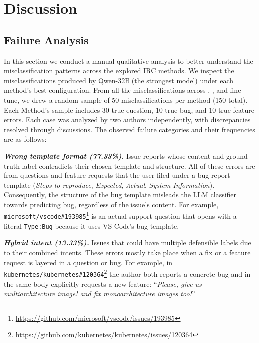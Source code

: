 
\section{Discussion}
\label{sec:discussion}

\subsection{Failure Analysis}
\label{sec:disc-failures}

In this section we conduct a manual qualitative analysis to better understand the misclassification patterns across the explored IRC methods. We inspect the misclassifications produced by Qwen-32B (the strongest model) under each method's best configuration. From all the misclassifications across \ragtag, \bragtag, and fine-tune, we drew a random sample of 50 misclassifications per method (150 total). Each Method's sample includes 30 true-question, 10 true-bug, and 10 true-feature errors. Each case was analyzed by two authors independently, with discrepancies resolved through discussions. The observed failure categories and their frequencies are as follows:

\textbf{\textit{Wrong template format (77.33\%).}} Issue reports whose content and ground-truth label contradicts their chosen template and structure. All of these errors are from questions and feature requests that the user filed under a bug-report template (\textit{Steps to reproduce}, \textit{Expected}, \textit{Actual}, \textit{System Information}). Consequently, the structure of the bug template misleads the LLM classifier towards predicting bug, regardless of the issue's content. For example, \texttt{microsoft/vscode\#193985}\footnote{\url{https://github.com/microsoft/vscode/issues/193985}} is an actual support question that opens with a literal \texttt{Type:Bug} because it uses VS Code's bug template.

\textbf{\textit{Hybrid intent (13.33\%).}} Issues that could have multiple defensible labels due to their combined intents. These errors mostly take place when a fix or a feature request is layered in a question or bug. For example, in \texttt{kubernetes/kubernetes\#120364}\footnote{\url{https://github.com/kubernetes/kubernetes/issues/120364}} the author both reports a concrete bug and in the same body explicitly requests a new feature: ``\textit{Please, give us multiarchitecture image! and fix monoarchitecture images too!}''

